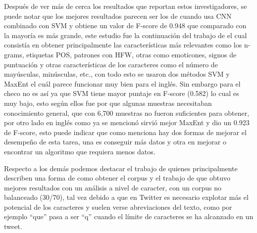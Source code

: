 	    \par Después de ver más de cerca los resultados que reportan estos investigadores, se puede notar que los mejores resultados parecen ser los de \cite{poria2016deeper} cuando usa CNN combinado con SVM y obtiene un valor de  \gls{F-score} de 0.948 que comparado con la mayoría es más grande, este estudio fue la continuación del trabajo de \cite{ptavcek2014sarcasm} el cual consistía en obtener principalmente las características más relevantes como los \gls{n-grams}, etiquetas \gls{POS}, patrones con \gls{HFW}, otras como emoticones, signos de puntuación y otras características de los caracteres como el número de mayúsculas, minúsculas, etc., con todo esto se usaron dos métodos \gls{SVM} y \gls{MaxEnt} el cuál parece funcionar muy bien para el inglés. Sin embargo para el checo no es así ya que SVM tiene mayor puntaje en F-score (0.582) lo cual es muy bajo, esto según ellos fue por que algunas muestras necesitaban conocimiento general, que con 6,700 muestras no fueron suficientes para obtener, por otro lado en inglés como ya se mencionó sirvió mejor \gls{MaxEnt} y dio un 0.923 de F-score, esto puede indicar que como \cite{domingos2012few} menciona hay dos formas de mejorar el desempeño de esta tarea, una es conseguir más datos y otra en mejorar o encontrar un algoritmo que requiera menos datos. 
	    
	    \par Respecto a los demás podemos destacar el trabajo de \cite{reyes2012making} quienes principalmente describen una forma de como obtener el corpus y el trabajo de  \cite{lopez2016character} que obtuvo mejores resultados con un análisis a nivel de caracter, con un corpus no balanceado (30/70), tal vez debido a que en Twitter es necesario explotar más el potencial de los caracteres y suelen verse abreviaciones del texto, como por ejemplo  ``que'' pasa a ser ``q'' cuando el límite de caracteres se ha alcanzado en un tweet. 